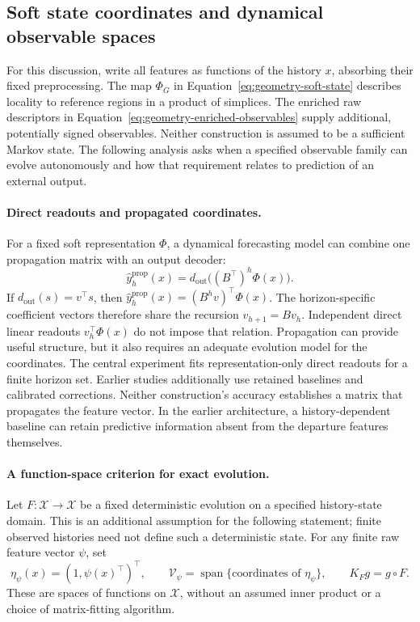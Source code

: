 \subsection{Soft state coordinates and dynamical observable spaces}
\label{sec:soft-state-dynamics}

For this discussion, write all features as functions of the history
$x$, absorbing their fixed preprocessing. The map $\Phi_G$ in
Equation~\eqref{eq:geometry-soft-state} describes locality to reference
regions in a product of simplices. The enriched raw descriptors in
Equation~\eqref{eq:geometry-enriched-observables} supply additional,
potentially signed observables. Neither construction is assumed to
be a sufficient Markov state. The following analysis asks when a
specified observable family can evolve autonomously and how that
requirement relates to prediction of an external output.

\paragraph{Direct readouts and propagated coordinates.}
For a fixed soft representation $\Phi$, a dynamical forecasting model
can combine one propagation matrix with an output decoder:
\begin{equation}
 \widehat y_h^{\mathrm{prop}}(x)
 =d_{\mathrm{out}}\bigl((B^\top)^h\Phi(x)\bigr).
 \label{eq:soft-state-propagated-readout}
\end{equation}
If $d_{\mathrm{out}}(s)=v^\top s$, then
$\widehat y_h^{\mathrm{prop}}(x)=(B^h v)^\top\Phi(x)$.
The horizon-specific coefficient vectors therefore share the recursion
$v_{h+1}=Bv_h$. Independent direct linear readouts
$v_h^\top\Phi(x)$ do not impose that relation. Propagation can provide
useful structure, but it also requires an adequate evolution model for
the coordinates. The central experiment fits representation-only direct
readouts for a finite horizon set. Earlier studies additionally use
retained baselines and calibrated corrections. Neither construction's
accuracy establishes a matrix that propagates the feature vector.
In the earlier architecture, a history-dependent baseline can retain
predictive information absent from the departure features themselves.

\paragraph{A function-space criterion for exact evolution.}
Let $F:\mathcal X\to\mathcal X$ be a fixed deterministic evolution on
a specified history-state domain. This is an additional assumption for
the following statement; finite observed histories need not define such
a deterministic state. For any finite raw feature vector $\psi$, set
\begin{equation}
 \eta_\psi(x)=(1,\psi(x)^\top)^\top,\qquad
 \mathcal V_\psi=\operatorname{span}\{\text{coordinates of }\eta_\psi\},
 \qquad K_F g=g\circ F.
 \label{eq:soft-state-observable-space}
\end{equation}
These are spaces of functions on $\mathcal X$, without an assumed
inner product or a choice of matrix-fitting algorithm.


